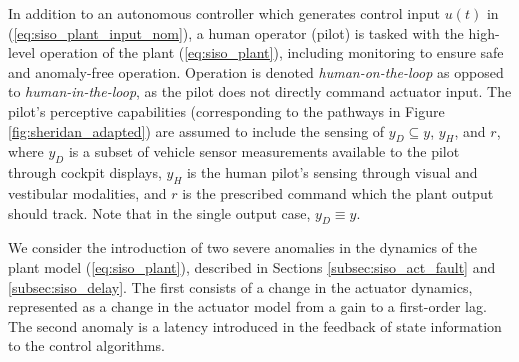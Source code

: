 In addition to an autonomous controller which generates control input $u(t)$ in (\ref{eq:siso_plant_input_nom}), a human operator (pilot) is tasked with the high-level operation of the plant (\ref{eq:siso_plant}), including monitoring to ensure safe and anomaly-free operation. Operation is denoted \textit{human-on-the-loop} as opposed to \textit{human-in-the-loop}, as the pilot does not directly command actuator input. The pilot's perceptive capabilities (corresponding to the pathways in Figure \ref{fig:sheridan_adapted}) are assumed to include the sensing of $y_{D} \subseteq y$, $y_{H}$, and $r$, where $y_{D}$ is a subset of vehicle sensor measurements available to the pilot through cockpit displays, $y_{H}$ is the human pilot's sensing through visual and vestibular modalities, and $r$ is the prescribed command which the plant output should track. Note that in the single output case, $y_D \equiv y$.


We consider the introduction of two severe anomalies in the dynamics of the plant model (\ref{eq:siso_plant}), described in Sections \ref{subsec:siso_act_fault} and \ref{subsec:siso_delay}. The first consists of a change in the actuator dynamics, represented as a change in the actuator model from a gain to a first-order lag. The second anomaly is a latency introduced in the feedback of state information to the control algorithms. 


